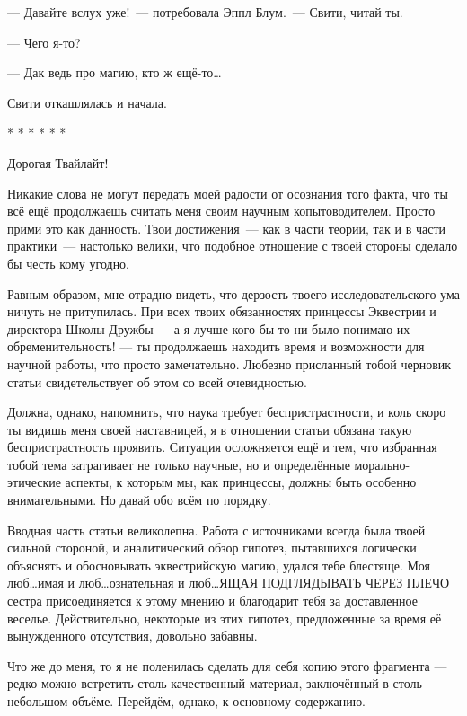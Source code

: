 \documentclass[fontsize=11pt,a5paper,titlepage=firstcover]{scrbook}
\begin{document}
--- Давайте вслух уже!~--- потребовала Эппл Блум.~--- Свити, читай ты.

--- Чего я-то?

--- Дак ведь про магию, кто ж ещё-то{\ldots}

Свити откашлялась и начала.

\begin{center}
	* * * * * *
\end{center}

Дорогая Твайлайт!

Никакие слова не могут передать моей радости от осознания того факта, что ты всё ещё продолжаешь считать меня своим научным копытоводителем. Просто прими это как данность. Твои достижения~--- как в части теории, так и в части практики~--- настолько велики, что подобное отношение с твоей стороны сделало бы честь кому угодно.

Равным образом, мне отрадно видеть, что дерзость твоего исследовательского ума ничуть не притупилась. При всех твоих обязанностях принцессы Эквестрии и директора Школы Дружбы --- а я лучше кого бы то ни было понимаю их обременительность! --- ты продолжаешь находить время и возможности для научной работы, что просто замечательно. Любезно присланный тобой черновик статьи свидетельствует об этом со всей очевидностью.

Должна, однако, напомнить, что наука требует беспристрастности, и коль скоро ты видишь меня своей наставницей, я в отношении статьи обязана такую беспристрастность проявить. Ситуация осложняется ещё и тем, что избранная тобой тема затрагивает не только научные, но и определённые морально-этические аспекты, к которым мы, как принцессы, должны быть особенно внимательными. Но давай обо всём по порядку.

Вводная часть статьи великолепна. Работа с источниками всегда была твоей сильной стороной, и аналитический обзор гипотез, пытавшихся логически объяснять и обосновывать эквестрийскую магию, удался тебе блестяще. Моя люб{\ldots}имая и люб{\ldots}ознательная и люб{\ldots}ЯЩАЯ ПОДГЛЯДЫВАТЬ ЧЕРЕЗ ПЛЕЧО сестра присоединяется к этому мнению и благодарит тебя за доставленное веселье. Действительно, некоторые из этих гипотез, предложенные за время её вынужденного отсутствия, довольно забавны.

Что же до меня, то я не поленилась сделать для себя копию этого фрагмента --- редко можно встретить столь качественный материал, заключённый в столь небольшом объёме. Перейдём, однако, к основному содержанию.
\end{document}
